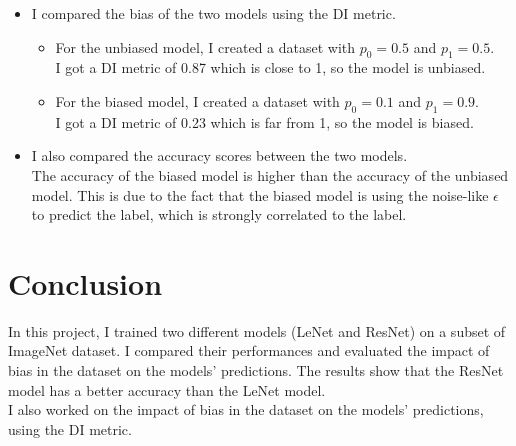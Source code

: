 \documentclass[12pt,a4paper]{article}
\begin{document}
\begin{itemize}
    \item I compared the bias of the two models using the DI metric.
    \begin{itemize}[label=-]
        \item For the unbiased model, I created a dataset with $p_0 = 0.5$ and $p_1 = 0.5$. \\
        I got a DI metric of 0.87 which is close to 1, so the model is unbiased.

        \item For the biased model, I created a dataset with $p_0 = 0.1$ and $p_1 = 0.9$. \\
        I got a DI metric of 0.23 which is far from 1, so the model is biased.\\
    \end{itemize}

    \item I also compared the accuracy scores between the two models.\\
    The accuracy of the biased model is higher than the accuracy of the unbiased model.
    This is due to the fact that the biased model is using the noise-like $\epsilon$ to predict the label, which is strongly correlated to the label.
\end{itemize}


\section{Conclusion}

In this project, I trained two different models (LeNet and ResNet) on a subset of ImageNet dataset.
I compared their performances and evaluated the impact of bias in the dataset on the models' predictions.
The results show that the ResNet model has a better accuracy than the LeNet model.\\
I also worked on the impact of bias in the dataset on the models' predictions, using the DI metric.
\end{document}
